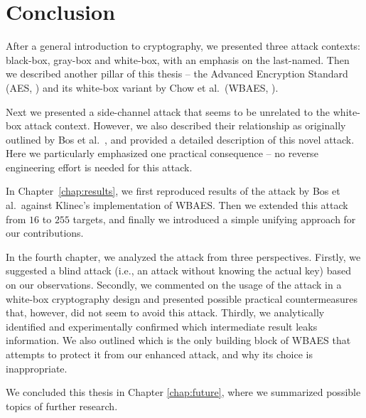 \cleardoublepage{}

\chapter*{Conclusion}
\label{chap:concl}

After a general introduction to cryptography, we presented three attack contexts: black-box, gray-box and white-box, with an emphasis on the last-named. Then we described another pillar of this thesis -- the Advanced Encryption Standard (AES, \cite{fips2001aes}) and its white-box variant by Chow et al.\ (WBAES, \cite{chow2002aes}).

Next we presented a side-channel attack that seems to be unrelated to the white-box attack context. However, we also described their relationship as originally outlined by Bos et al.\ \cite{bos2015differential}, and provided a detailed description of this novel attack. Here we particularly emphasized one practical consequence -- no reverse engineering effort is needed for this attack.

In Chapter~\ref{chap:results}, we first reproduced results of the attack by Bos et al.\ against Klinec's implementation \cite{klinec2013implementation} of WBAES. Then we extended this attack from $16$ to $255$ targets, and finally we introduced a simple unifying approach for our contributions.

In the fourth chapter, we analyzed the attack from three perspectives. Firstly, we suggested a blind attack (i.e., an attack without knowing the actual key) based on our observations. Secondly, we commented on the usage of the attack in a white-box cryptography design and presented possible practical countermeasures that, however, did not seem to avoid this attack. Thirdly, we analytically identified and experimentally confirmed which intermediate result leaks information. We also outlined which is the only building block of WBAES that attempts to protect it from our enhanced attack, and why its choice is inappropriate.

We concluded this thesis in Chapter \ref{chap:future}, where we summarized possible topics of further research.
